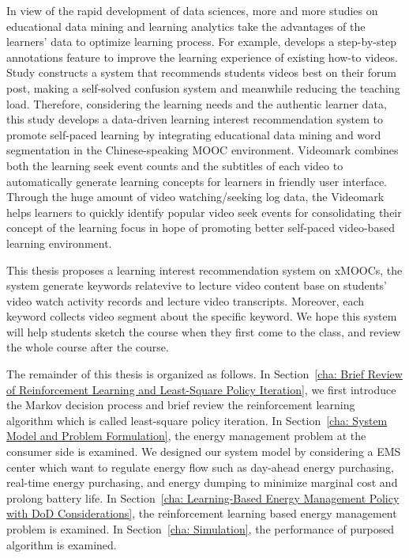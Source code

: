 In view of the rapid development of data sciences,
more and more studies on educational data mining and learning analytics take the advantages of the learners’ data to optimize learning process.
For example, \cite{kim2014} develops a step-by-step annotations feature to improve the learning experience of existing how-to videos.
Study \cite{agrawal2015} constructs a system that recommends students videos best on their forum post, making a self-solved confusion system and meanwhile reducing the teaching load.
Therefore, considering the learning needs and the authentic learner data,
this study develops a data-driven learning interest recommendation system to promote self-paced learning by integrating educational data mining and word segmentation in the Chinese-speaking MOOC environment.
Videomark combines both the learning seek event counts and the subtitles of each video to automatically generate learning concepts for learners in friendly user interface.
Through the huge amount of video watching/seeking log data, the Videomark helps learners to quickly identify popular video seek events for consolidating their concept of the learning focus in hope of promoting better self-paced video-based learning environment.

This thesis proposes a learning interest recommendation system on xMOOCs, the system generate keywords relatevive to lecture video content base on students' video watch activity records and lecture video transcripts.
Moreover, each keyword collects video segment about the specific keyword.
We hope this system will help students sketch the course when they first come to the class,
and review the whole course after the course.

The remainder of this thesis is organized as follows.
In Section~\ref{cha: Brief Review of Reinforcement Learning and Least-Square Policy Iteration}, we first introduce the Markov decision process and brief review the reinforcement learning algorithm which is called least-square policy iteration.
In Section~\ref{cha: System Model and Problem Formulation}, the energy management problem at the consumer side is examined. We designed our system model by considering a EMS center which want to regulate energy flow such as day-ahead energy purchasing, real-time energy purchasing, and energy dumping to minimize marginal cost and prolong battery life.
In Section~\ref{cha: Learning-Based Energy Management Policy with DoD Considerations}, the reinforcement learning based energy management problem is examined.
In Section~\ref{cha: Simulation}, the performance of purposed algorithm is examined.
